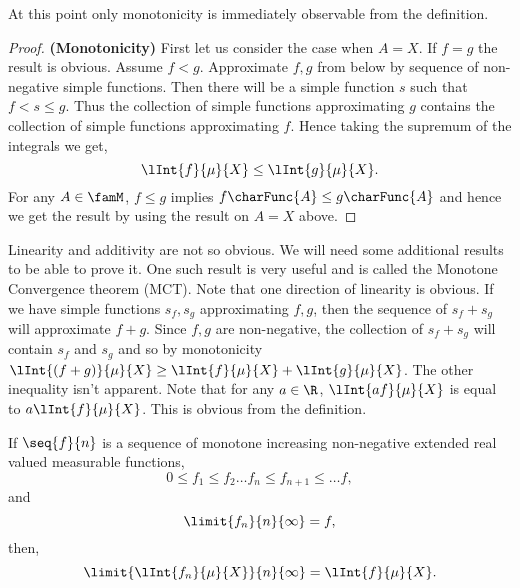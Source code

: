 At this point only monotonicity is immediately observable from the definition.
\begin{proof}
    \textbf{(Monotonicity)}
    First let us consider the case when $A = X$. If $f = g$ the result is obvious. Assume $f < g$. 
    Approximate $f,g$ from below by sequence of non-negative simple functions. Then there will be a simple
    function $s$ such that $f < s \leq g$. Thus the collection of simple functions approximating $g$ contains
    the collection of simple functions approximating $f$. Hence taking the supremum of the integrals we get,
    \[\lInt{f}{\mu}{X} \leq \lInt{g}{\mu}{X}.\]
    For any $A \in \famM$, $f\leq g$ implies $f\charFunc{A}\leq g\charFunc{A}$ and hence we get
    the result by using the result on $A = X$ above.
\end{proof}
\begin{Remark}
    Linearity and additivity are not so obvious. We will need some additional results to be able to prove it. One
    such result is very useful and is called the Monotone Convergence theorem (MCT). Note that one direction
    of linearity is obvious. If we have simple functions $s_f,s_g$ approximating $f,g$, then the sequence of 
    $s_f + s_g$ will approximate $f+g$. Since $f,g$ are non-negative, the collection of $s_f + s_g$ will
    contain $s_f$ and $s_g$ and so by monotonicity $\lInt{(f+g)}{\mu}{X} \geq \lInt{f}{\mu}{X} +
    \lInt{g}{\mu}{X}$. The other inequality isn't apparent. Note that for any $a \in \R$, $\lInt{af}{\mu}{X}$
    is equal to $a\lInt{f}{\mu}{X}$. This is obvious from the definition.
\end{Remark}
\begin{Theorem}[name=Monotone convergence theorem (MCT)]\label{thm:monotone_conv_thm}
    If $\seq{f}{n}$ is a sequence of monotone increasing non-negative extended real valued measurable 
    functions,
    \[0\leq f_1 \leq f_2 \ldots f_n \leq f_{n+1} \leq \ldots f, \]
    and 
    \[\limit{f_n}{n}{\infty} = f, \]
    then,
    \[\limit{\lInt{f_n}{\mu}{X}}{n}{\infty} = \lInt{f}{\mu}{X}.\]
\end{Theorem}
